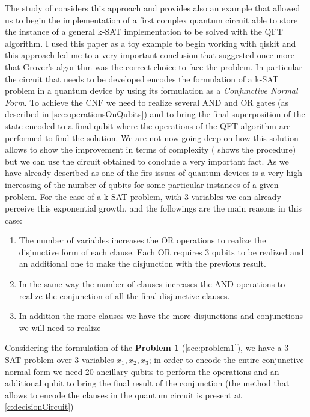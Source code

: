 \documentclass[english]{article}
\begin{document}
				The study of \cite[Ohya M. and Masuda N.]{quantumNP} considers this approach and provides also an example that allowed us to begin the implementation of a first complex quantum circuit able to store the instance of a general k-SAT implementation to be solved with the QFT algorithm. I used this paper as a toy example to begin working with qiskit and this approach led me to a very important conclusion that suggested once more that Grover's algorithm was the correct choice to face the problem. In particular the circuit that needs to be developed encodes the formulation of a k-SAT problem in a quantum device by using its formulation as a \emph{Conjunctive Normal Form}. To achieve the CNF we need to realize several AND and OR gates (as described in \ref{sec:operationsOnQubits}) and to bring the final superposition of the state encoded to a final qubit where the operations of the QFT algorithm are performed to find the solution. We are not now going deep on how this solution allows to show the improvement in terms of complexity (\cite[Ohya M. and Masuda N.]{quantumNP} shows the procedure) but we can use the circuit obtained to conclude a very important fact. As we have already described as one of the firs issues of quantum devices is a very high increasing of the number of qubits for some particular instances of a given problem. For the case of a k-SAT problem, with 3 variables we can already perceive this exponential growth, and the followings are the main reasons in this case:
				\begin{enumerate}
					\item The number of variables increases the OR operations to realize the disjunctive form of each clause. Each OR requires 3 qubits to be realized and an additional one to make the disjunction with the previous result.
					
					\item In the same way the number of clauses increases the AND operations to realize the conjunction of all the final disjunctive clauses.
					
					\item In addition the more clauses we have the more disjunctions and conjunctions we will need to realize
				\end{enumerate}
				Considering the formulation of the \textbf{Problem 1} (\ref{sec:problem1}), we have a 3-SAT problem over 3 variables $x_1, x_2, x_3$; in order to encode the entire conjunctive normal form we need 20 ancillary qubits to perform the operations and an additional qubit to bring the final result of the conjunction (the method that allows to encode the clauses in the quantum circuit is present at \ref{c:decisionCircuit}) 
\end{document}
